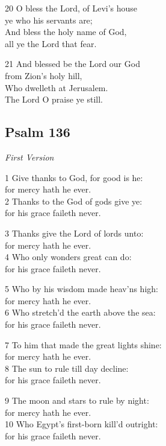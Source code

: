 20 O bless the Lord, of Levi’s house\\
ye who his servants are;\\
And bless the holy name of God,\\
all ye the Lord that fear.

21 And blessed be the Lord our God\\
from Zion’s holy hill,\\
Who dwelleth at Jerusalem.\\
The Lord O praise ye still.

\begin{center}
\quad{}\quad{}
\end{center}

\subsection*{Psalm 136}

\emph{First Version}

1 Give thanks to God, for good is he:\\
for mercy hath he ever.\\
2 Thanks to the God of gods give ye:\\
for his grace faileth never.

3 Thanks give the Lord of lords unto:\\
for mercy hath he ever.\\
4 Who only wonders great can do:\\
for his grace faileth never.

5 Who by his wisdom made heav’ns high:\\
for mercy hath he ever.\\
6 Who stretch’d the earth above the sea:\\
for his grace faileth never.

7 To him that made the great lights shine:\\
for mercy hath he ever.\\
8 The sun to rule till day decline:\\
for his grace faileth never.

9 The moon and stars to rule by night:\\
for mercy hath he ever.\\
10 Who Egypt’s first-born kill’d outright:\\
for his grace faileth never.

